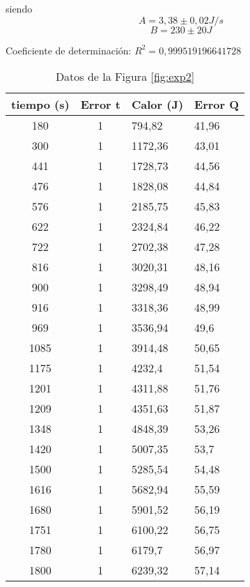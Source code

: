 \documentclass[a4paper,12pt,spanish]{article}
\begin{document}
	siendo 
	\[ A = 3,38 \pm 0,02 \si{J/s}
	\]
	\[B = 230 \pm 20\si{J}
	\]
	
	Coeficiente de determinación: $R^2 = 0,999519196641728$
	 
	
	
	
	
	
	\begin{table}[H]
		\centering
		\begin{tabular}{|c|c|l|l|}
			\hline
			tiempo (s)  & Error t & Calor (J)  & Error Q\\ \hline\hline
			180  & 1 & 794,82  & 41,96 \\ \hline
			300  & 1 & 1172,36 & 43,01 \\ \hline
			441  & 1 & 1728,73 & 44,56 \\ \hline
			476  & 1 & 1828,08 & 44,84 \\ \hline
			576  & 1 & 2185,75 & 45,83 \\ \hline
			622  & 1 & 2324,84 & 46,22 \\ \hline
			722  & 1 & 2702,38 & 47,28 \\ \hline
			816  & 1 & 3020,31 & 48,16 \\ \hline
			900  & 1 & 3298,49 & 48,94 \\ \hline
			916  & 1 & 3318,36 & 48,99 \\ \hline
			969  & 1 & 3536,94 & 49,6  \\ \hline
			1085 & 1 & 3914,48 & 50,65 \\ \hline
			1175 & 1 & 4232,4  & 51,54 \\ \hline
			1201 & 1 & 4311,88 & 51,76 \\ \hline
			1209 & 1 & 4351,63 & 51,87 \\ \hline
			1348 & 1 & 4848,39 & 53,26 \\ \hline
			1420 & 1 & 5007,35 & 53,7  \\ \hline
			1500 & 1 & 5285,54 & 54,48 \\ \hline
			1616 & 1 & 5682,94 & 55,59 \\ \hline
			1680 & 1 & 5901,52 & 56,19 \\ \hline
			1751 & 1 & 6100,22 & 56,75 \\ \hline
			1780 & 1 & 6179,7  & 56,97 \\ \hline
			1800 & 1 & 6239,32 & 57,14 \\ \hline
		\end{tabular}
		\caption{Datos de la Figura \ref{fig:exp2}}
		\label{tab:fig2exp2}
	\end{table}
	
\end{document}
